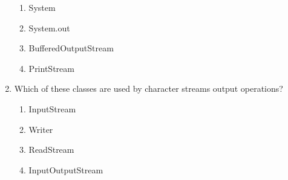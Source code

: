 \documentclass[11pt,a4paper]{article}
\begin{document}
\begin{enumerate}
\begin{enumerate}
\item System
\item System.out
\item BufferedOutputStream
\item PrintStream
\end{enumerate}
\item Which of these classes are used by character streams output operations?
\begin{enumerate}
\item InputStream
\item Writer
\item ReadStream
\item InputOutputStream
\end{enumerate}
\end{enumerate}
\end{document}
